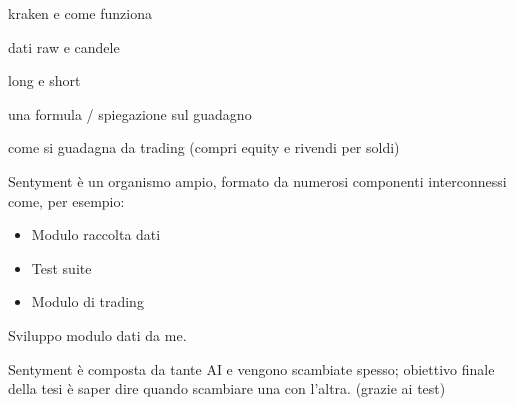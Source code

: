 \documentclass{article}
\begin{document}
		
		
		kraken e come funziona
		
		
		dati raw e candele
		
		
		long e short
		
		
		una formula / spiegazione sul guadagno
		
		come si guadagna da trading (compri equity e rivendi per soldi)
		
		
		
		
		
		Sentyment è un organismo ampio, formato da numerosi componenti interconnessi come, per esempio:
		\begin{itemize}
			\item Modulo raccolta dati
			\item Test suite
			\item Modulo di trading
		\end{itemize}
	
	
		Sviluppo modulo dati da me.
		
		Sentyment è composta da tante AI e vengono scambiate spesso; obiettivo finale della tesi è saper dire quando scambiare una con l'altra. (grazie ai test)
	    
		
		
	    \newpage
	    
\end{document}
